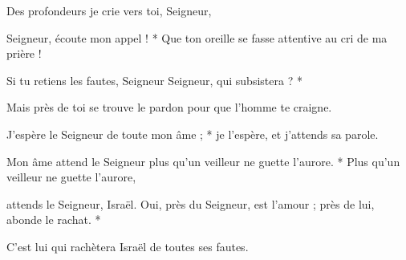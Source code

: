 \item Des profondeurs je crie vers toi, Seigneur,

\item Seigneur, écoute mon appel ! * Que ton oreille se fasse attentive au cri de ma prière !

\item Si tu retiens les fautes, Seigneur Seigneur, qui subsistera ? *

\item Mais près de toi se trouve le pardon pour que l'homme te craigne.

\item J'espère le Seigneur de toute mon âme ; * je l'espère, et j'attends sa parole.

\item Mon âme attend le Seigneur plus qu'un veilleur ne guette l'aurore. * Plus qu'un veilleur ne guette l'aurore,

\item attends le Seigneur, Israël. Oui, près du Seigneur, est l'amour ; près de lui, abonde le rachat. *

\item C'est lui qui rachètera Israël de toutes ses fautes.